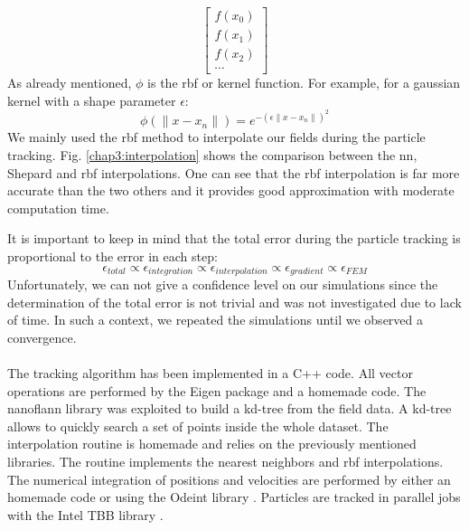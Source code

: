 \begin{refsection}
\begin{equation}
\begin{bmatrix}
      f(x_{0}) \\
      f(x_{1}) \\
      f(x_{2}) \\
      \cdots
    \end{bmatrix}
  \end{equation}
  As already mentioned, $\phi$ is the \acrshort{rbf} or kernel function. For example, for a gaussian kernel with a shape parameter $\epsilon$:
  \begin{equation}
    \phi(\lVert x - x_{n}\rVert) = e^{-(\epsilon\lVert x - x_{n}\rVert)^{2}}
  \end{equation}
  We mainly used the \acrshort{rbf} method to interpolate our fields during the particle tracking. Fig. \ref{chap3:interpolation} shows the comparison between the \acrshort{nn}, Shepard and \acrshort{rbf} interpolations. One can see that the \acrshort{rbf} interpolation is far more accurate than the two others and it provides good approximation with moderate computation time.

  It is important to keep in mind that the total error during the particle tracking is proportional to the error in each step:
  \begin{equation}
    \epsilon_{total} \propto \epsilon_{integration}\propto\epsilon_{interpolation}\propto\epsilon_{gradient}\propto\epsilon_{FEM}
  \end{equation}
  Unfortunately, we can not give a confidence level on our simulations since the determination of the total error is not trivial and was not investigated due to lack of time. In such a context, we repeated the simulations until we observed a convergence.


  

  \paragraph{}
  The tracking algorithm has been implemented in a C++ code. All vector operations are performed by the Eigen \cite{eigenweb} package and a homemade code. The nanoflann library \cite{blanco2014nanoflann} was exploited to build a kd-tree from the field data. A kd-tree allows to quickly search a set of points inside the whole dataset. The interpolation routine is homemade and relies on the previously mentioned libraries. The routine implements the nearest neighbors and \acrshort{rbf} interpolations. The numerical integration of positions and velocities are performed by either an homemade code or using the Odeint library \cite{Ahnert2011,Mulansky2014}. Particles are tracked in parallel jobs with the Intel TBB library \cite{tbb2019}.


\end{refsection}

